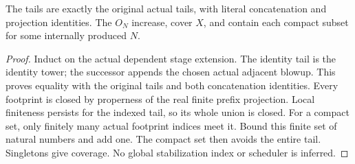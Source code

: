 \begin{lemma}
\label{hir:actual-thread-lf-tails-cover}
\leanok
{}
The tails are exactly the original actual tails, with literal concatenation
and projection identities. The $O_N$ increase, cover $X$, and contain each
compact subset for some internally produced $N$.
\end{lemma}
\begin{proof}
Induct on the actual dependent stage extension. The identity tail is the
identity tower; the successor appends the chosen actual adjacent blowup.
This proves equality with the original tails and both concatenation identities.
Every footprint is closed by properness of the real finite prefix projection.
Local finiteness persists for the indexed tail, so its whole union is closed.
For a compact set, only finitely many actual footprint indices meet it.
Bound this finite set of natural numbers and add one. The compact set then
avoids the entire tail. Singletons give coverage. No global stabilization
index or scheduler is inferred.
\end{proof}

